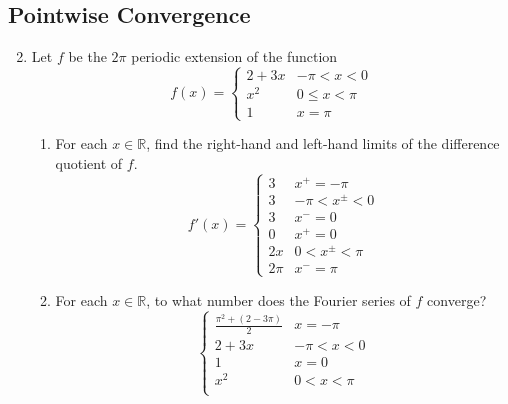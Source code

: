\documentclass{article}
\begin{document}
\subsection{Pointwise Convergence}

\begin{enumerate}
      \setcounter{enumi}{1}
      \item Let $f$ be the $2\pi$ periodic extension of the function
            \[
                  f(x) = \begin{cases}
                        2 + 3x & -\pi < x < 0   \\
                        x^2    & 0 \leq x < \pi \\
                        1      & x = \pi
                  \end{cases}
            \]
            \begin{enumerate}
                  \item For each $x\in\mathbb{R}$, find the right-hand and
                        left-hand limits of the difference quotient of $f$.
                        \[
                              f'(x) = \begin{cases}
                                    3    & x^+ = -\pi       \\
                                    3    & -\pi < x^\pm < 0 \\
                                    3    & x^- = 0          \\
                                    0    & x^+ = 0          \\
                                    2x   & 0 < x^\pm < \pi  \\
                                    2\pi & x^- = \pi
                              \end{cases}
                        \]
                  \item For each $x\in\mathbb{R}$, to what number does the
                        Fourier series of $f$ converge?
                        \[
                              \begin{cases}
                                    \frac{\pi^2+(2-3\pi)}{2} & x = -\pi     \\
                                    2+3x                     & -\pi < x < 0 \\
                                    1                        & x = 0        \\
                                    x^2                      & 0 < x < \pi  \\

\end{cases}\]
\end{enumerate}
\end{enumerate}
\end{document}
